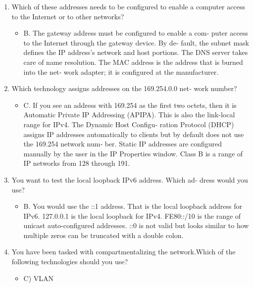 \documentclass{article}
\begin{document}
\begin{enumerate}
    \item Which of these addresses needs to be configured to enable a
computer access to the Internet or to other networks?
    \begin{itemize}
        \item B. The gateway address must be configured to enable a com‐
puter access to the Internet through the gateway device. By de‐
fault, the subnet mask defines the IP address’s network and
host portions. The DNS server takes care of name resolution.
The MAC address is the address that is burned into the net‐
work adapter; it is configured at the manufacturer.
    \end{itemize}
    \item Which technology assigns addresses on the 169.254.0.0 net‐
work number?
    \begin{itemize}
        \item C. If you see an address with 169.254 as the first two octets,
then it is Automatic Private IP Addressing (APIPA). This is
also the link-local range for IPv4. The Dynamic Host Configu‐
ration Protocol (DHCP) assigns IP addresses automatically to
clients but by default does not use the 169.254 network num‐
ber. Static IP addresses are configured manually by the user in
the IP Properties window. Class B is a range of IP networks
from 128 through 191.
    \end{itemize}
    \item You want to test the local loopback IPv6 address. Which ad‐
dress would you use?
    \begin{itemize}
        \item B. You would use the ::1 address. That is the local loopback
address for IPv6. 127.0.0.1 is the local loopback for IPv4.
FE80::/10 is the range of unicast auto-configured addresses. ::0
is not valid but looks similar to how multiple zeros can be
truncated with a double colon.
    \end{itemize}
    \item You have been tasked with compartmentalizing the network.Which of the following technologies should you use?
    \begin{itemize}
        \item C) VLAN 
    \end{itemize}
\end{enumerate}
\end{document}
